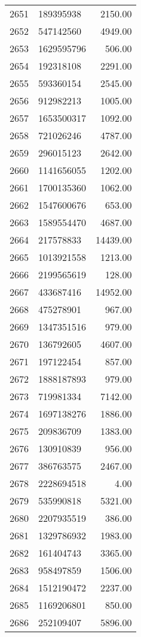 \begin{table}[ht]
\begin{tabular}{rlr}
  2651 & 189395938 & 2150.00 \\ 
  2652 & 547142560 & 4949.00 \\ 
  2653 & 1629595796 & 506.00 \\ 
  2654 & 192318108 & 2291.00 \\ 
  2655 & 593360154 & 2545.00 \\ 
  2656 & 912982213 & 1005.00 \\ 
  2657 & 1653500317 & 1092.00 \\ 
  2658 & 721026246 & 4787.00 \\ 
  2659 & 296015123 & 2642.00 \\ 
  2660 & 1141656055 & 1202.00 \\ 
  2661 & 1700135360 & 1062.00 \\ 
  2662 & 1547600676 & 653.00 \\ 
  2663 & 1589554470 & 4687.00 \\ 
  2664 & 217578833 & 14439.00 \\ 
  2665 & 1013921558 & 1213.00 \\ 
  2666 & 2199565619 & 128.00 \\ 
  2667 & 433687416 & 14952.00 \\ 
  2668 & 475278901 & 967.00 \\ 
  2669 & 1347351516 & 979.00 \\ 
  2670 & 136792605 & 4607.00 \\ 
  2671 & 197122454 & 857.00 \\ 
  2672 & 1888187893 & 979.00 \\ 
  2673 & 719981334 & 7142.00 \\ 
  2674 & 1697138276 & 1886.00 \\ 
  2675 & 209836709 & 1383.00 \\ 
  2676 & 130910839 & 956.00 \\ 
  2677 & 386763575 & 2467.00 \\ 
  2678 & 2228694518 & 4.00 \\ 
  2679 & 535990818 & 5321.00 \\ 
  2680 & 2207935519 & 386.00 \\ 
  2681 & 1329786932 & 1983.00 \\ 
  2682 & 161404743 & 3365.00 \\ 
  2683 & 958497859 & 1506.00 \\ 
  2684 & 1512190472 & 2237.00 \\ 
  2685 & 1169206801 & 850.00 \\ 
  2686 & 252109407 & 5896.00 \\ 

\end{tabular}
\end{table}
